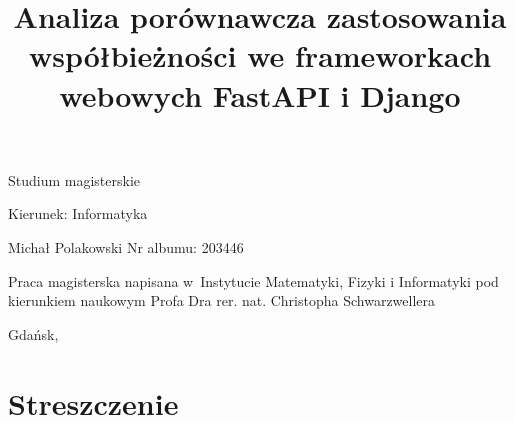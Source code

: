 \documentclass[12pt,a4paper,oneside,openany,parskip=full,parindent=full]{book}
\begin{document}
\begin{center}

\vspace{1cm}

Studium magisterskie
\end{center}

\vspace{1cm}

\noindent Kierunek: Informatyka

\vspace{1cm}

{
\leftskip=10cm\noindent
Michał Polakowski\newline
Nr albumu: 203446\newline
}

\vspace{2cm}

\title{Analiza porównawcza zastosowania współbieżności we frameworkach webowych FastAPI i Django}
\makeatletter

\begin{center}
\LARGE\bf
\@title
\end{center}

\vspace{2cm}

{
\leftskip=8cm\noindent
Praca magisterska\newline 
napisana w~Instytucie Matematyki, Fizyki i Informatyki\newline
pod kierunkiem naukowym\newline
Profa Dra rer. nat. Christopha Schwarzwellera
}

\vfill

\begin{center}
Gdańsk, \the\year
\end{center}
\thispagestyle{empty}

\clearpage
\thispagestyle{empty}
\clearpage

\tableofcontents

\clearpage
\chapter*{Streszczenie}









\clearpage



\clearpage
\end{document}
